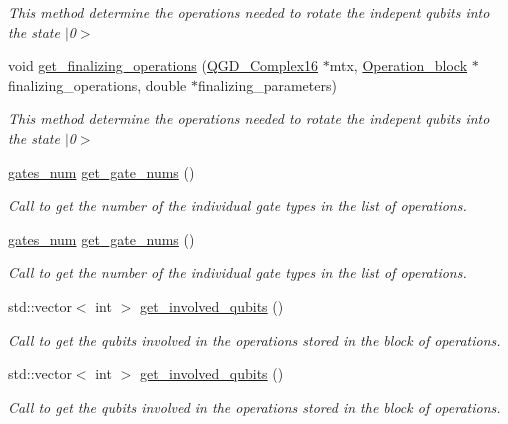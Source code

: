 \begin{DoxyCompactItemize}
\begin{DoxyCompactList}\small\item\em This method determine the operations needed to rotate the indepent qubits into the state $\vert$0$>$ \end{DoxyCompactList}\item 
void \hyperlink{class_decomposition___base_a9832cc5308c00b73d3e6bc331a77c7f7}{get\+\_\+finalizing\+\_\+operations} (\hyperlink{struct_q_g_d___complex16}{Q\+G\+D\+\_\+\+Complex16} $\ast$mtx, \hyperlink{class_operation__block}{Operation\+\_\+block} $\ast$finalizing\+\_\+operations, double $\ast$finalizing\+\_\+parameters)
\begin{DoxyCompactList}\small\item\em This method determine the operations needed to rotate the indepent qubits into the state $\vert$0$>$ \end{DoxyCompactList}\item 
\hyperlink{structgates__num}{gates\+\_\+num} \hyperlink{class_operation__block_ac39ab782da3e34c8ec4acf6181fbc5f7}{get\+\_\+gate\+\_\+nums} ()
\begin{DoxyCompactList}\small\item\em Call to get the number of the individual gate types in the list of operations. \end{DoxyCompactList}\item 
\hyperlink{structgates__num}{gates\+\_\+num} \hyperlink{class_operation__block_ac39ab782da3e34c8ec4acf6181fbc5f7}{get\+\_\+gate\+\_\+nums} ()
\begin{DoxyCompactList}\small\item\em Call to get the number of the individual gate types in the list of operations. \end{DoxyCompactList}\item 
std\+::vector$<$ int $>$ \hyperlink{class_operation__block_a92e4f0566e4b36830652729377a8e936}{get\+\_\+involved\+\_\+qubits} ()
\begin{DoxyCompactList}\small\item\em Call to get the qubits involved in the operations stored in the block of operations. \end{DoxyCompactList}\item 
std\+::vector$<$ int $>$ \hyperlink{class_operation__block_aebdbb71e02ff6826d967d55f4cd4db28}{get\+\_\+involved\+\_\+qubits} ()
\begin{DoxyCompactList}\small\item\em Call to get the qubits involved in the operations stored in the block of operations. \end{DoxyCompactList}\item 

\end{DoxyCompactItemize}
